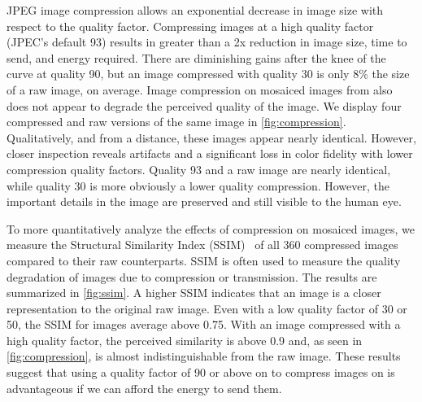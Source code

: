 
JPEG image compression allows an exponential decrease in image size with respect to the quality factor.
Compressing images at a high quality factor (JPEC's default 93) results in greater than a 2x reduction in image size, time to send, and energy required. There are diminishing gains after the knee of the curve at quality 90, but an image compressed with quality 30 is only 8\% the size of a raw image, on average. Image compression on mosaiced images from \name also does not appear to degrade the perceived quality of the image. We display four compressed and raw versions of the same image in \cref{fig:compression}. Qualitatively, and from a distance, these images appear nearly identical. However, closer inspection reveals artifacts and a significant loss in color fidelity with lower compression quality factors. Quality 93 and a raw image are nearly identical, while quality 30 is more obviously a lower quality compression. However, the important details in the image are preserved and still visible to the human eye.


To more quantitatively analyze the effects of compression on mosaiced images, we measure the Structural Similarity Index (SSIM)~\cite{wang2004image} of all 360 compressed images compared to their raw counterparts. SSIM is often used to measure the quality degradation of images due to compression or transmission. The results are summarized in \cref{fig:ssim}. A higher SSIM indicates that an image is a closer representation to the original raw image.
Even with a low quality factor of 30 or 50, the SSIM for images average above 0.75. With an image compressed with a high quality factor, the perceived similarity is above 0.9 and, as seen in \cref{fig:compression}, is almost indistinguishable from the raw image. These results suggest that using a quality factor of 90 or above on to compress images on \name is advantageous if we can afford the energy to send them.

